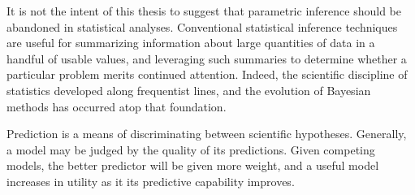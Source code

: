 \documentclass[12pt, a4paper]{article}
\begin{document}
    It is not the intent of this thesis to suggest that parametric inference should be abandoned in statistical analyses.  Conventional statistical inference techniques are useful for summarizing information about large quantities of data in a handful of usable values, and leveraging such summaries to determine whether a particular problem merits continued attention.  Indeed, the scientific discipline of statistics developed along frequentist lines, and the evolution of Bayesian methods has occurred atop that foundation.


    Prediction is a means of discriminating between scientific hypotheses.  Generally, a model may be judged by the quality of its predictions.  Given competing models, the better predictor will be given more weight, and a useful model increases in utility as it its predictive capability improves.

\end{document}
